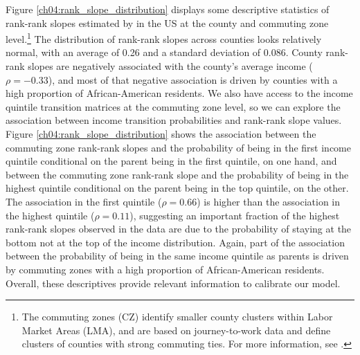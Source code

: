 \documentclass[class=article, crop=false, 12pt]{standalone}
\begin{document}



Figure \ref{ch04:rank_slope_distribution} displays some descriptive statistics of rank-rank slopes estimated by \citet{chetty2014} in the US at the county and commuting zone level.\footnote{The commuting zones (CZ) identify smaller county clusters within Labor Market Areas (LMA), and are based on journey-to-work data and define clusters of counties with strong commuting ties. For more information, see \citet{tolbert1996}.} The distribution of rank-rank slopes across counties looks relatively normal, with an average of 0.26 and a standard deviation of 0.086. County rank-rank slopes are negatively associated with the county's average income ($\rho = -0.33$), and most of that negative association is driven by counties with a high proportion of African-American residents. We also have access to the income quintile transition matrices at the commuting zone level, so we can explore the association between income transition probabilities and rank-rank slope values. Figure \ref{ch04:rank_slope_distribution} shows the association between the commuting zone rank-rank slopes and the probability of being in the first income quintile conditional on the parent being in the first quintile, on one hand,  and between the commuting zone rank-rank slope and the probability of being in the highest quintile conditional on the parent being in the top quintile, on the other. The association in the first quintile ($\rho = 0.66$) is higher than the association in the highest quintile ($\rho = 0.11$), suggesting an important fraction of the highest rank-rank slopes observed in the data are due to the probability of staying at the bottom not at the top of the income distribution. Again, part of the association between the probability of being in the same income quintile as parents is driven by commuting zones with a high proportion of African-American residents. Overall, these descriptives provide relevant information to calibrate our model. 
\end{document}
